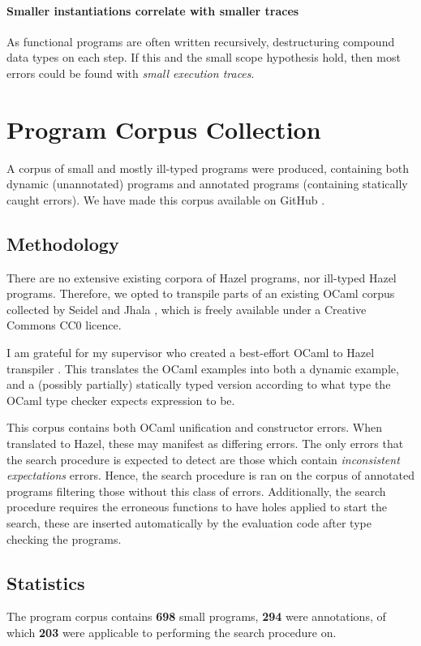 \paragraph{Smaller instantiations correlate with smaller traces} As functional programs are often written recursively, destructuring compound data types on each step. If this and the small scope hypothesis hold, then most errors could be found with \textit{small execution traces}.

\section{Program Corpus Collection}\label{sec:CorpusCollection}

A corpus of small and mostly ill-typed programs were produced, containing both dynamic (unannotated) programs and annotated programs (containing statically caught errors). We have made this corpus available on GitHub \cite{HazelCorpus}.

\subsection{Methodology}
There are no extensive existing corpora of Hazel programs, nor ill-typed Hazel programs. Therefore, we opted to transpile parts of an existing OCaml corpus collected by Seidel and Jhala \cite{OCamlCorpus}, which is freely available under a Creative Commons CC0 licence. 

I am grateful for my supervisor who created a best-effort OCaml to Hazel transpiler \cite{HazelOfOCaml}. This translates the OCaml examples into both a dynamic example, and a (possibly partially) statically typed version according to what type the OCaml type checker expects expression to be.

This corpus contains both OCaml unification and constructor errors. When translated to Hazel, these may manifest as differing errors. The only errors that the search procedure is expected to detect are those which contain \textit{inconsistent expectations} errors. Hence, the search procedure is ran on the corpus of annotated programs filtering those without this class of errors. Additionally, the search procedure requires the erroneous functions to have holes applied to start the search, these are inserted automatically by the evaluation code after type checking the programs.


\subsection{Statistics}
The program corpus contains \textbf{698} small programs, \textbf{294} were annotations, of which \textbf{203} were applicable to performing the search procedure on.

